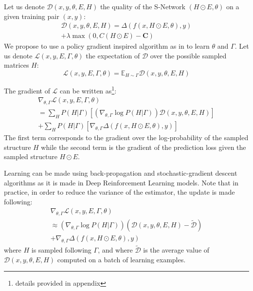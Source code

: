 \documentclass[10pt,twocolumn,letterpaper]{article}
\begin{document}
Let us denote $\mathcal{D}(x,y,\theta,E,H)$ the quality of the S-Network $(H \odot E,\theta)$ on a given training pair $(x,y)$: 
\begin{multline} \label{D_def}
\mathcal{D}(x,y,\theta,E,H)=\Delta(f(x,H \odot E,\theta),y) \\+ \lambda \max(0, C(H \odot E) - \mathbf{C})
\end{multline}
We propose to use a policy gradient inspired algorithm as in \cite{DBLP:journals/corr/DenoyerG14,DBLP:journals/corr/BengioBPP15} to learn $\theta$ and $\Gamma$. Let us denote $\mathcal{L}(x,y,E,\Gamma,\theta)$ the expectation of $\mathcal{D}$ over the possible sampled matrices $H$:
\begin{equation}
\mathcal{L}(x,y,E,\Gamma,\theta) = \mathbb{E}_{H \sim \Gamma} \mathcal{D}(x,y,\theta,E,H)
\end{equation}

The gradient of $\mathcal{L}$ can be written as\footnote{details provided in appendix}:
\begin{multline}
\nabla_{\theta,\Gamma} \mathcal{L}(x,y,E,\Gamma,\theta) \\ = \sum\limits_H P(H|\Gamma) \left[(\nabla_{\theta,\Gamma}  \log P(H|\Gamma)) \mathcal{D}(x,y,\theta,E,H) \right] \\+ \sum\limits_H P(H|\Gamma) \left[ \nabla_{\theta,\Gamma} \Delta(f(x,H \odot E,\theta),y) \right]
\end{multline}
The first term corresponds to the gradient over the log-probability of the sampled structure $H$ while the second term is the gradient of the prediction loss given the sampled structure $H \odot E$.

Learning can be made using back-propagation and stochastic-gradient descent algorithms as it is made in Deep Reinforcement Learning models. Note that in practice, in order to reduce the variance of the estimator, the update is made following:
\begin{multline}
\nabla_{\theta,\Gamma} \mathcal{L}(x,y,E,\Gamma,\theta) \\ \approx (\nabla_{\theta,\Gamma} \log P(H|\Gamma)) (\mathcal{D}(x,y,\theta,E,H)-\tilde{\mathcal{D}} )  \\+ \nabla_{\theta,\Gamma} \Delta(f(x,H \odot E,\theta),y)
\end{multline}
where $H$ is sampled following $\Gamma$, and where $\tilde{\mathcal{D}}$ is the average value of $\mathcal{D}(x,y,\theta,E,H)$ computed on a batch of learning examples. 
\end{document}
